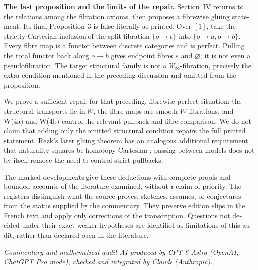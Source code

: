 \begin{otherlanguage}{english}
\medskip
\noindent\textbf{The last proposition and the limits of the repair.}
Section~IV returns to the relations among the fibration axioms, then proposes a fibrewise gluing statement. Its final Proposition~3 is false literally as printed. Over \([1]\), take the strictly Cartesian inclusion of the split fibration \(\{o\to a\}\) into \(\{o\to a,o\to b\}\). Every fibre map is a functor between discrete categories and is perfect. Pulling the total functor back along \(o\to b\) gives endpoint fibres \(e\) and \(\varnothing\); it is not even a pseudofibration. The target structural family is not a \(W_\infty\)-fibration, precisely the extra condition mentioned in the preceding discussion and omitted from the proposition.

We prove a sufficient repair for that preceding, fibrewise-perfect situation: the structural transports lie in \(W\), the fibre maps are smooth \(W\)-fibrations, and W(4a) and W(4b) control the relevant pullback and fibre comparison. We do not claim that adding only the omitted structural condition repairs the full printed statement. Rezk's later gluing theorem has an analogous additional requirement that naturality squares be homotopy Cartesian \citep[Theorem~7.1]{Rezk1998Sharp}; passing between models does not by itself remove the need to control strict pullbacks.

The marked developments give these deductions with complete proofs and bounded accounts of the literature examined, without a claim of priority. The registers distinguish what the source proves, sketches, assumes, or conjectures from the status supplied by the commentary. They preserve edition slips in the French text and apply only corrections of the transcription. Questions not decided under their exact weaker hypotheses are identified as limitations of this audit, rather than declared open in the literature.

\medskip
\noindent\textit{Commentary and mathematical audit AI-produced by GPT-6 Astra (OpenAI, ChatGPT Pro mode), checked and integrated by Claude (Anthropic).}
\nocite{*}
\end{otherlanguage}
